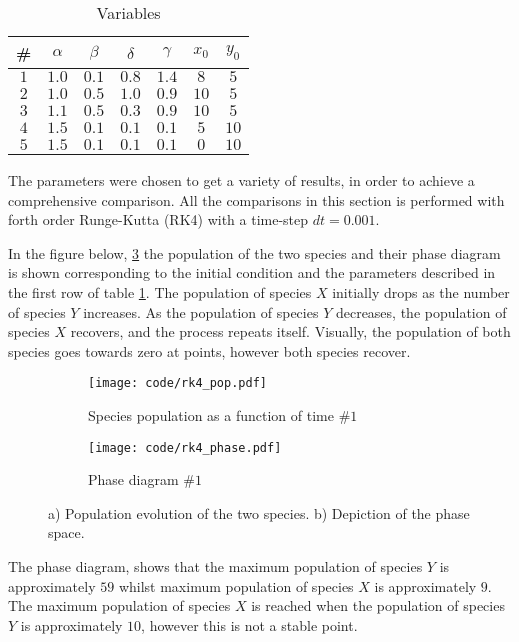 \documentclass[a4paper]{article}
\newcommand{\newparagraph}{\vspace{.5cm}\noindent}
\begin{document}
\begin{table}[H]
    \centering
    \caption{Variables}
    \begin{tabular}{|c|c|c|c|c|c|c|}\hline
        \# &$\alpha$ & $\beta$ & $\delta$ & $\gamma$ & $x_0$ & $y_0$ \\\hline
        $1$ & $1.0$ & $0.1$ & $0.8$ & $1.4$ & $8$ & $5$\\\hline
        $2$ & $1.0$ & $0.5$ & $1.0$ & $0.9$ & $10$ & $5$\\\hline
        $3$ & $1.1$ & $0.5$ & $0.3$ & $0.9$ & $10$ & $5$ \\\hline
        $4$ & $1.5$ & $0.1$ & $0.1$ & $0.1$ & $5$ & $10$\\\hline
        $5$ & $1.5$ & $0.1$ & $0.1$ & $0.1$ & $0$ & $10$\\\hline
    \end{tabular}
    \label{tab: variables}
\end{table}\noindent
The parameters were chosen to get a variety of results, in order to achieve a comprehensive comparison. All the comparisons in this section is performed with forth order Runge-Kutta (RK4) with a time-step $dt = 0.001$.

\newparagraph
In the figure below, \ref{fig: param 1} the population of the two species and their phase diagram is shown corresponding to the initial condition and the parameters described in the first row of table \ref{tab: variables}. The population of species $X$ initially drops as the number of species $Y$ increases. As the population of species $Y$ decreases, the population of species $X$ recovers, and the process repeats itself. Visually, the population of both species goes towards zero at points, however both species recover. 
\begin{figure}[H]
    \centering
    \begin{subfigure}{0.45\textwidth}
        \texttt{[image: code/rk4\_pop.pdf]}
        \caption{Species population as a function of time $\#1$}
        \label{fig: param 1 pop}
    \end{subfigure}
    \hfill    
    \begin{subfigure}{0.45\textwidth}
        \texttt{[image: code/rk4\_phase.pdf]}
        \caption{Phase diagram $\#1$}
        \label{fig: param 1 phase}
    \end{subfigure}
    \caption{a) Population evolution of the two species. b) Depiction of the phase space.}
    \label{fig: param 1}
\end{figure}\noindent
The phase diagram, shows that the maximum population of species $Y$ is approximately $59$ whilst maximum population of species $X$ is approximately $9$. The maximum population of species $X$ is reached when the population of species $Y$ is approximately $10$, however this is not a stable point.
\end{document}
